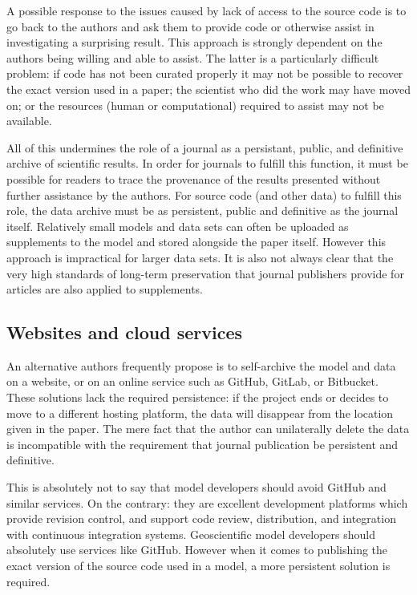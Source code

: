 \documentclass[a4paper,11pt]{article}
\begin{document}
A possible response to the issues caused by lack of access to the source
code is to go back to the authors and ask them to provide code or otherwise
assist in investigating a surprising result. This approach is strongly
dependent on the authors being willing and able to assist. The latter is a
particularly difficult problem: if code has not been curated properly it may
not be possible to recover the exact version used in a paper; the scientist
who did the work may have moved on; or the resources (human or
computational) required to assist may not be available.

All of this undermines the role of a journal as a persistant, public, and
definitive archive of scientific results. In order for journals to fulfill
this function, it must be possible for readers to trace the provenance of
the results presented without further assistance by the authors. For source
code (and other data) to fulfill this role, the data archive must be as
persistent, public and definitive as the journal itself. Relatively small
models and data sets can often be uploaded as supplements to the model and
stored alongside the paper itself. However this approach is impractical for
larger data sets. It is also not always clear that the very high standards
of long-term preservation that journal publishers provide for articles are
also applied to supplements. 

\subsection{Websites and cloud services}

An alternative authors frequently propose is to self-archive the model and data
on a website, or on an online service such as GitHub, GitLab, or Bitbucket. These solutions lack
the required persistence: if the project ends or decides to move to a
different hosting platform, the data will disappear from the location given
in the paper. The mere fact that the author can unilaterally delete the data
is incompatible with the requirement that journal publication be persistent
and definitive.

This is absolutely not to say that model developers should avoid GitHub and
similar services. On the contrary: they are excellent development
platforms which provide revision control, and support code review,
distribution, and integration with continuous integration
systems. Geoscientific model developers should absolutely use services like
GitHub. However when it comes to publishing the exact version of the source
code used in a model, a more persistent solution is required.
\end{document}
